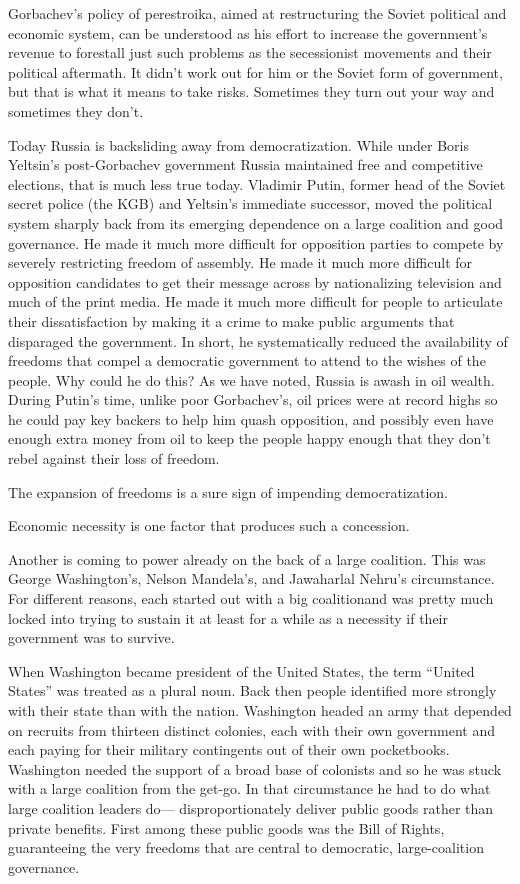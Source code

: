 \documentclass[10pt]{article}
\begin{document}
{\large Gorbachev's policy of perestroika, aimed at restructuring the Soviet
political and economic system, can be understood as his effort to increase the
government's revenue to forestall just such problems as the secessionist
movements and their political aftermath. It didn't work out for him or the Soviet
form of government, but that is what it means to take risks. Sometimes they turn
out your way and sometimes they don't.}

{\large Today Russia is backsliding away from democratization. While under Boris
Yeltsin's post-Gorbachev government Russia maintained free and competitive
elections, that is much less true today. Vladimir Putin, former head of the
Soviet secret police (the KGB) and Yeltsin's immediate successor, moved the
political system sharply back from its emerging dependence on a large coalition
and good governance. He made it much more difficult for opposition parties to
compete by severely restricting freedom of assembly. He made it much more
difficult for opposition candidates to get their message across by nationalizing
television and much of the print media. He made it much more difficult for people
to articulate their dissatisfaction by making it a crime to make public arguments
that disparaged the government. In short, he systematically reduced the
availability of freedoms that compel a democratic government to attend to the
wishes of the people. Why could he do this? As we have noted, Russia is awash in
oil wealth. During Putin's time, unlike poor Gorbachev's, oil prices were at
record highs so he could pay key backers to help him quash opposition, and
possibly even have enough extra money from oil to keep the people happy enough
that they don't rebel against their loss of freedom.}

{\large The expansion of freedoms is a sure sign of impending democratization.}

{\large Economic necessity is one factor that produces such a concession.}

{\large Another is coming to power already on the back of a large coalition.
This was George Washington's, Nelson Mandela's, and Jawaharlal Nehru's
circumstance. For different reasons, each started out with a big coalitionand was
pretty much locked into trying to sustain it at least for a while as a necessity
if their government was to survive.}

{\large When Washington became president of the United States, the term ``United
States'' was treated as a plural noun. Back then people identified more strongly
with their state than with the nation. Washington headed an army that depended on
recruits from thirteen distinct colonies, each with their own government and each
paying for their military contingents out of their own pocketbooks. Washington
needed the support of a broad base of colonists and so he was stuck with a large
coalition from the get-go. In that circumstance he had to do what large coalition
leaders do--- disproportionately deliver public goods rather than private
benefits. First among these public goods was the Bill of Rights, guaranteeing the
very freedoms that are central to democratic, large-coalition governance.}
\end{document}
